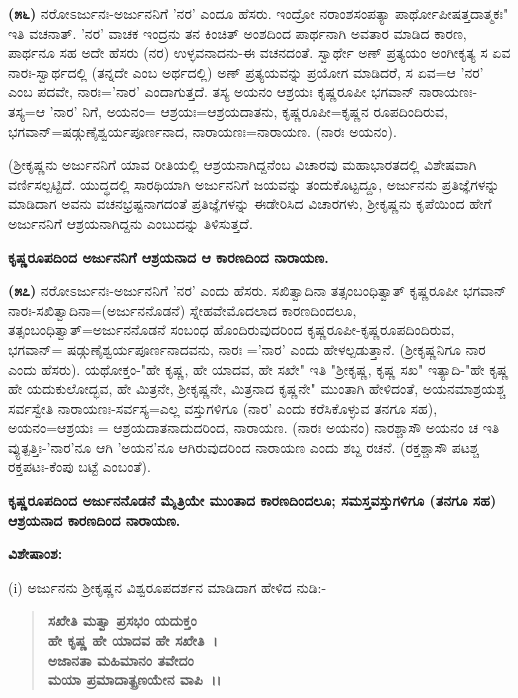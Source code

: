 \textbf{(೫೬)} ನರೋಽರ್ಜುನಃ-ಅರ್ಜುನನಿಗೆ 'ನರ' ಎಂದೂ ಹೆಸರು. ಇಂದ್ರೋ ನರಾಂಶ\-ಸಂಪತ್ಯಾ ಪಾರ್ಥೋಪೀಷತ್ತದಾತ್ಮಕಃ" ಇತಿ ವಚನಾತ್. 'ನರ' ವಾಚಕ ಇಂದ್ರನು ತನ ಕಿಂಚಿತ್ ಅಂಶದಿಂದ ಪಾರ್ಥನಾಗಿ ಅವತಾರ ಮಾಡಿದ ಕಾರಣ, ಪಾರ್ಥನೂ ಸಹ ಅದೇ ಹೆಸರು (ನರ) ಉಳ್ಳವನಾದನು-ಈ ವಚನದಂತೆ. ಸ್ವಾರ್ಥೇ ಅಣ್ ಪ್ರತ್ಯಯಂ ಅಂಗೀಕೃತ್ಯ ಸ ಏವ ನಾರಃ-ಸ್ವಾರ್ಥದಲ್ಲಿ (ತನ್ನದೇ ಎಂಬ ಅರ್ಥದಲ್ಲಿ) ಅಣ್ ಪ್ರತ್ಯಯವನ್ನು ಪ್ರಯೋಗ ಮಾಡಿದರೆ, ಸ ಏವ=ಆ 'ನರ' ಎಂಬ ಪದವೇ, ನಾರಃ='ನಾರ' ಎಂದಾಗುತ್ತದೆ. ತಸ್ಯ ಅಯನಂ ಆಶ್ರಯಃ ಕೃಷ್ಣರೂಪೀ ಭಗವಾನ್ ನಾರಾಯಣಃ-ತಸ್ಯ=ಆ 'ನಾರ' ನಿಗೆ, ಅಯನಂ= ಆಶ್ರಯಃ=ಆಶ್ರಯದಾತನು, ಕೃಷ್ಣರೂಪೀ=ಕೃಷ್ಣನ ರೂಪದಿಂದಿರುವ, ಭಗವಾನ್=ಷಡ್ಗುಣೈ\-ಶ್ವರ್ಯಪೂರ್ಣನಾದ, ನಾರಾಯಣಃ=ನಾರಾಯಣ. (ನಾರಃ ಅಯನಂ).

(ಶ‍್ರೀಕೃಷ್ಣನು ಅರ್ಜುನನಿಗೆ ಯಾವ ರೀತಿಯಲ್ಲಿ ಆಶ್ರಯನಾಗಿದ್ದನೆಂಬ ವಿಚಾರವು ಮಹಾಭಾರತದಲ್ಲಿ ವಿಶೇಷವಾಗಿ ವರ್ಣಿಸಲ್ಪಟ್ಟಿದೆ. ಯುದ್ಧದಲ್ಲಿ ಸಾರಥಿಯಾಗಿ ಅರ್ಜುನನಿಗೆ ಜಯವನ್ನು ತಂದುಕೊಟ್ಟದ್ದೂ, ಅರ್ಜುನನು ಪ್ರತಿಜ್ಞೆಗಳನ್ನು ಮಾಡಿದಾಗ ಅವನು ವಚನಭ್ರಷ್ಟನಾಗದಂತೆ ಪ್ರತಿಜ್ಞೆಗಳನ್ನು ಈಡೇರಿಸಿದ ವಿಚಾರಗಳು, ಶ‍್ರೀಕೃಷ್ಣನು ಕೃಪೆಯಿಂದ ಹೇಗೆ ಅರ್ಜುನನಿಗೆ ಆಶ್ರಯನಾಗಿದ್ದನು ಎಂಬುದನ್ನು ತಿಳಿಸುತ್ತದೆ.

\begin{center}
\textbf{ಕೃಷ್ಣರೂಪದಿಂದ ಅರ್ಜುನನಿಗೆ ಆಶ್ರಯನಾದ ಆ ಕಾರಣದಿಂದ ನಾರಾಯಣ.}
\end{center}

\textbf{(೫೭)} ನರೋಽರ್ಜುನಃ-ಅರ್ಜುನನಿಗೆ 'ನರ' ಎಂದು ಹೆಸರು. ಸಖಿತ್ವಾದಿನಾ ತತ್ಸಂಬಂಧಿ\-ತ್ವಾತ್ ಕೃಷ್ಣರೂಪೀ ಭಗವಾನ್ ನಾರಃ-ಸಖಿತ್ವಾದಿನಾ=(ಅರ್ಜುನನೊಡನೆ) ಸ್ನೇಹವೇ\break ಮೊದಲಾದ ಕಾರಣದಿಂದಲೂ, ತತ್ಸಂಬಂಧಿತ್ವಾತ್=ಅರ್ಜುನನೊಡನೆ ಸಂಬಂಧ ಹೊಂದಿರುವುದರಿಂದ ಕೃಷ್ಣರೂಪೀ-ಕೃಷ್ಣರೂಪದಿಂದಿರುವ, ಭಗವಾನ್= ಷಡ್ಗುಣೈಶ್ವರ್ಯಪೂರ್ಣನಾದವನು, ನಾರಃ ='ನಾರ' ಎಂದು ಹೇಳಲ್ಪಡುತ್ತಾನೆ. (ಶ‍್ರೀಕೃಷ್ಣನಿಗೂ ನಾರ ಎಂದು ಹೆಸರು). ಯಥೋಕ್ತಂ-"ಹೇ ಕೃಷ್ಣ, ಹೇ ಯಾದವ, ಹೇ ಸಖೇ" ಇತಿ "ಶ‍್ರೀಕೃಷ್ಣ, ಕೃಷ್ಣ ಸಖ" ಇತ್ಯಾದಿ-"ಹೇ ಕೃಷ್ಣ ಹೇ ಯದುಕುಲೋದ್ಭವ, ಹೇ ಮಿತ್ರನೇ, ಶ‍್ರೀಕೃಷ್ಣನೇ, ಮಿತ್ರನಾದ ಕೃಷ್ಣನೇ" ಮುಂತಾಗಿ ಹೇಳಿದಂತೆ, ಅಯನಮಾಶ್ರಯಶ್ಚ ಸರ್ವಸ್ವೇತಿ ನಾರಾಯಣಃ-\-ಸರ್ವಸ್ಯ=ಎಲ್ಲ ವಸ್ತುಗಳಿಗೂ (ನಾರ' ಎಂದು ಕರೆಸಿಕೊಳ್ಳುವ ತನಗೂ ಸಹ), ಅಯನಂ=\break ಆಶ್ರಯಃ = ಆಶ್ರಯದಾತನಾದುದರಿಂದ, ನಾರಾಯಣ. (ನಾರಃ ಅಯನಂ) ನಾರಶ್ಚಾಸೌ ಅಯನಂ ಚ ಇತಿ ವ್ಯುತ್ಪತ್ತಿಃ-'ನಾರ'ನೂ ಆಗಿ 'ಅಯನ'ನೂ ಆಗಿರುವುದರಿಂದ ನಾರಾಯಣ ಎಂದು ಶಬ್ದ ರಚನೆ. (ರಕ್ತಶ್ಚಾಸೌ ಪಟಶ್ಚ ರಕ್ತಪಟಃ-ಕೆಂಪು ಬಟ್ಟೆ ಎಂಬಂತೆ).

\begin{center}
\textbf{ಕೃಷ್ಣರೂಪದಿಂದ ಅರ್ಜುನನೊಡನೆ ಮೈತ್ರಿಯೇ ಮುಂತಾದ ಕಾರಣದಿಂದಲೂ; ಸಮಸ್ತವಸ್ತುಗಳಿಗೂ (ತನಗೂ ಸಹ) ಆಶ್ರಯನಾದ ಕಾರಣದಿಂದ ನಾರಾಯಣ.}
\end{center}

\noindent
\textbf{ವಿಶೇಷಾಂಶ:\enginline{-}}

(i) ಅರ್ಜುನನು ಶ‍್ರೀಕೃಷ್ಣನ ವಿಶ್ವರೂಪದರ್ಶನ ಮಾಡಿದಾಗ ಹೇಳಿದ ನುಡಿ:-

\newpage

\begin{verse}
\textbf{ಸಖೇತಿ ಮತ್ವಾ ಪ್ರಸಭಂ ಯದುಕ್ತಂ}\\\textbf{ಹೇ ಕೃಷ್ಣ ಹೇ ಯಾದವ ಹೇ ಸಖೇತಿ~।}\\\textbf{ಅಜಾನತಾ ಮಹಿಮಾನಂ ತವೇದಂ}\\\textbf{ಮಯಾ ಪ್ರಮಾದಾತ್ಪ್ರಣಯೇನ ವಾಪಿ~।।}
\end{verse}

